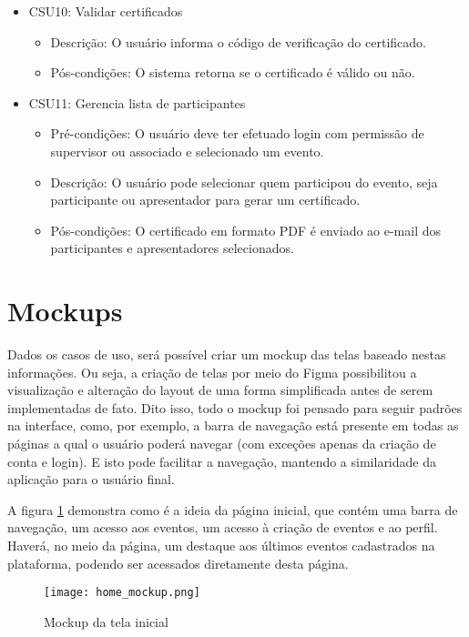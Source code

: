 \begin{itemize}
\begin{itemize}
        \end{itemize}
    \item CSU10: Validar certificados
        \begin{itemize}
            \item Descrição: O usuário informa o código de verificação do certificado.
            \item Pós-condições: O sistema retorna se o certificado é válido ou não.
        \end{itemize}
    \item CSU11: Gerencia lista de participantes
        \begin{itemize}
            \item Pré-condições: O usuário deve ter efetuado login com permissão de supervisor ou associado e selecionado um evento.
            \item Descrição: O usuário pode selecionar quem participou do evento, seja participante ou apresentador para gerar um certificado.
            \item Pós-condições: O certificado em formato PDF é enviado ao e-mail dos participantes e apresentadores selecionados.
        \end{itemize}
        
\end{itemize}

\section{Mockups}
Dados os casos de uso, será possível criar um mockup das telas baseado nestas informações. Ou seja, a criação de telas por meio do Figma possibilitou a visualização e alteração do layout de uma forma simplificada antes de serem implementadas de fato. Dito isso, todo o mockup foi pensado para seguir padrões na interface, como, por exemplo, a barra de navegação está presente em todas as páginas a qual o usuário poderá navegar (com exceções apenas da criação de conta e login). E isto pode facilitar a navegação, mantendo a similaridade da aplicação para o usuário final.  

A figura \ref{home_mockup} demonstra como é a ideia da página inicial, que contém uma barra de navegação, um acesso aos eventos, um acesso à criação de eventos e ao perfil. Haverá, no meio da página, um destaque aos últimos eventos cadastrados na plataforma, podendo ser acessados diretamente desta página.
\begin{figure}[H]
    \caption{\label{home_mockup}Mockup da tela inicial}
    \vspace{5pt}
    \centering
    \texttt{[image: home\_mockup.png]}
    \vspace{5pt}
\end{figure}

